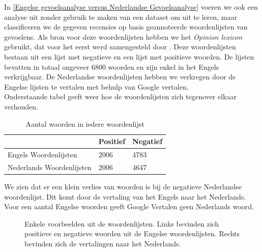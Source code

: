In \ref{Engelse gevoelsanalyse versus Nederlandse Gevoelsanalyse} voeren we ook een analyse uit zonder gebruik te maken van een dataset om uit te leren, maar classificeren we de gegeven recensies op basis geannoteerde woordenlijsten van gevoelens.  
Als bron voor deze woordenlijsten hebben we het \textit{Opinion lexicon} gebruikt, dat voor het eerst werd samengesteld door \cite{hu2004mining}. Deze woordenlijsten bestaan uit een lijst met negatieve en een lijst met positieve woorden. De lijsten bevatten in totaal ongeveer 6800 woorden en zijn enkel in het Engels verkrijgbaar. De Nederlandse woordenlijsten hebben we verkregen door de Engelse lijsten te vertalen met behulp van Google vertalen.\\

Onderstaande tabel geeft weer hoe de woordenlijsten zich tegenover elkaar verhouden.

\begin{table}[H]
\centering
\begin{tabular}{l|l|l|}
\cline{2-3}
 & Positief & Negatief \\ \hline
\multicolumn{1}{|l|}{Engels Woordenlijsten}     & 2006     & 4783     \\ \hline
\multicolumn{1}{|l|}{Nederlands Woordenlijsten} & 2006     & 4647     \\ \hline
\end{tabular}
\caption{Aantal woorden in iedere woordenlijst}
\label{table: Verlies in woordenschat}
\end{table}

We zien dat er een klein verlies van woorden is bij de negatieve Nederlandse woordenlijst. Dit komt door de vertaling van het Engels naar het Nederlands. Voor een aantal Engelse woorden geeft Google Vertalen geen Nederlands woord. 

\begin{figure}[H]%
    \centering
    \caption{Enkele voorbeelden uit de woordenlijsten. Links bevinden zich positieve en negatieve woorden uit de Engelse woordenlijsten. Rechts bevinden zich de vertalingen naar het Nederlands.}
    \label{vbwoordenlijsten}
\end{figure}

